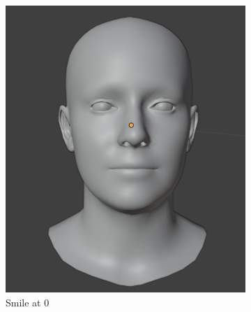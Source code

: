 \documentclass[../../main.tex]{subfiles}
\begin{document}
\begin{figure}[h]
  \centering
  \begin{subfigure}{0.3\linewidth} 
      \includegraphics[width=\linewidth]{chapters/background_work/images/blendshapes_example/blendshapes_example_1.png} 
      \caption{Smile at 0} 
  \end{subfigure} 
  \hfill 
  \begin{subfigure}{0.3\linewidth} 

\end{subfigure}
\end{figure}
\end{document}
